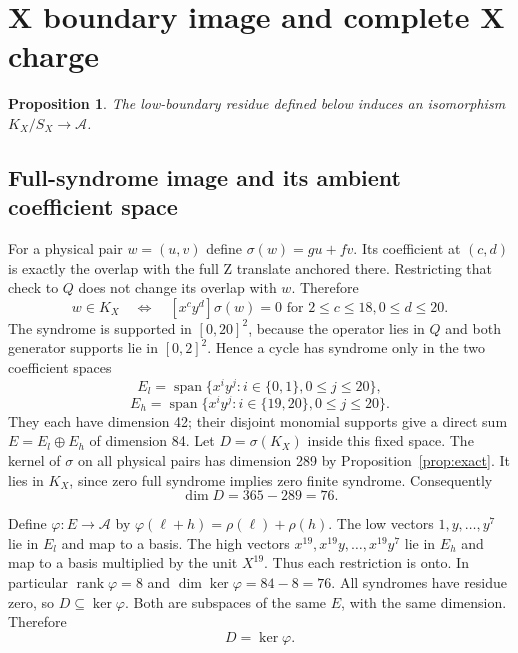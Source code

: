 \documentclass{article}
\newtheorem{proposition}{Proposition}
\DeclareMathOperator{\rank}{rank}
\DeclareMathOperator{\spn}{span}
\begin{document}
\section{X boundary image and complete X charge}\label{sec:xcharge}

\begin{proposition}\label{prop:xcharge}
  The low-boundary residue defined below induces an isomorphism \(K_X/S_X \to \mathcal{A}\).
\end{proposition}

\subsection{Full-syndrome image and its ambient coefficient space}\label{sec:x-image}

For a physical pair \(w = (u,v)\) define \(\sigma(w) = gu + fv\). Its coefficient at \((c,d)\) is
exactly the overlap with the full Z translate anchored there. Restricting that check to \(Q\)
does not change its overlap with \(w\). Therefore
\begin{equation}
  w \in K_X \quad\Longleftrightarrow\quad
  [x^c y^d]\sigma(w) = 0 \text{ for } 2 \le c \le 18, 0 \le d \le 20.
\end{equation}
The syndrome is supported in \([0,20]^2\), because the operator lies in \(Q\) and both generator
supports lie in \([0,2]^2\). Hence a cycle has syndrome only in the two coefficient spaces
\begin{equation}
  E_l = \spn\{x^i y^j : i \in \{0,1\}, 0 \le j \le 20\},
\end{equation}
\begin{equation}
  E_h = \spn\{x^i y^j : i \in \{19,20\}, 0 \le j \le 20\}.
\end{equation}
They each have dimension 42; their disjoint monomial supports give a direct sum
\(E = E_l \oplus E_h\) of dimension 84. Let \(D = \sigma(K_X)\) inside this fixed space. The
kernel of \(\sigma\) on all physical pairs has dimension 289 by Proposition~\ref{prop:exact}. It
lies in \(K_X\), since zero full syndrome implies zero finite syndrome. Consequently
\begin{equation}
  \dim D = 365 - 289 = 76.
\end{equation}

Define \(\varphi \colon E \to \mathcal{A}\) by \(\varphi(\ell + h) = \rho(\ell) + \rho(h)\). The
low vectors \(1, y, \dots, y^7\) lie in \(E_l\) and map to a basis. The high vectors
\(x^{19}, x^{19} y, \dots, x^{19} y^7\) lie in \(E_h\) and map to a basis multiplied by the unit
\(X^{19}\). Thus each restriction is onto. In particular \(\rank\varphi = 8\) and
\(\dim\ker\varphi = 84 - 8 = 76\). All syndromes have residue zero, so
\(D \subseteq \ker\varphi\). Both are subspaces of the same \(E\), with the same dimension.
Therefore
\begin{equation}
  D = \ker\varphi.
\end{equation}
\end{document}
